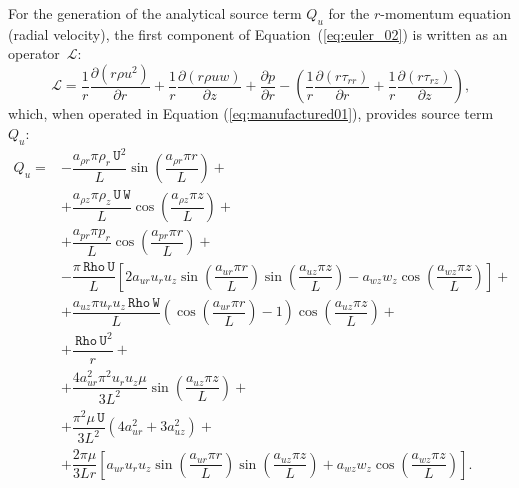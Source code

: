 \documentclass[10pt]{article}
\newcommand{\Diff}[2] {\dfrac{\partial( #1)}{\partial #2}}
\newcommand{\diff}[2] {\dfrac{\partial #1}{\partial #2}}
\newcommand{\Lo}{\,\mathcal{L}}
\newcommand{\Rho}{\,\mathtt{Rho}}
\newcommand{\U}{\,\mathtt{U}}
\newcommand{\W}{\,\mathtt{W}}
\begin{document}
For the generation of the analytical source term $Q_u$ for the $r$-momentum equation (radial velocity), the first component of Equation~(\ref{eq:euler_02}) is written as an  operator $\Lo$:
\begin{equation*}
 \Lo=\dfrac{1}{r}\Diff{r \rho u^2 }{r}+ \dfrac{1}{r}\Diff{r \rho u w }{z}+\diff{p}{r}-\left(\dfrac{1}{r}\Diff{r \tau_{rr}}{r}+\dfrac{1}{r}\Diff{r \tau_{rz}}{z}\right),
\end{equation*}
which, when operated in Equation (\ref{eq:manufactured01}), provides source term $Q_{u}$:
\begin{equation}
 \begin{split}
 \displaystyle
Q_u  =
&-\dfrac{a_{\rho r} \pi \rho_r \U^2 }{L}\sin\left(\dfrac{a_{\rho r} \pi r}{L}\right)+ \\
&+\dfrac{a_{\rho z} \pi \rho_z \U \W }{L}\cos\left(\dfrac{a_{\rho z} \pi z}{L}\right)+ \\
&+\dfrac{a_{pr} \pi p_r }{L}\cos\left(\dfrac{a_{pr} \pi r}{L}\right)+ \\
&-\dfrac{\pi \Rho \U}{L}\left[2 a_{ur} u_r u_z \sin\left(\dfrac{a_{ur} \pi r}{L}\right) \sin\left(\dfrac{a_{uz} \pi z}{L}\right)-a_{wz} w_z \cos\left(\dfrac{a_{wz} \pi z}{L}\right)\right] + \\
&+\dfrac{a_{uz} \pi u_r u_z \Rho \W}{L}\left( \cos\left(\dfrac{a_{ur} \pi r}{L}\right) -1 \right)  \cos\left(\dfrac{a_{uz} \pi z}{L}\right)+ \\
&+\dfrac{\Rho \U^2}{r}  +\\
&+\dfrac{4a_{ur}^2 \pi^2 u_r u_z \mu }{3L^2}\sin\left(\dfrac{a_{uz} \pi z}{L}\right)+ \\
&+\dfrac{ \pi^2 \mu \U}{3L^2}(4 a_{ur}^2+3 a_{uz}^2)+ \\
&+\dfrac{2\pi \mu}{3Lr}\left[a_{ur} u_r u_z \sin\left(\dfrac{a_{ur} \pi r}{L}\right) \sin\left(\dfrac{a_{uz} \pi z}{L}\right)+a_{wz} w_z \cos\left(\dfrac{a_{wz} \pi z}{L}\right)\right].
\end{split}
\end{equation}
%
\end{document}
